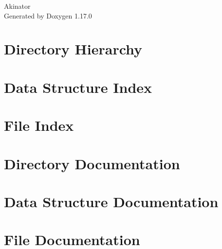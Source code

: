 \documentclass[twoside]{book}
\newcommand{\+}{\discretionary{\mbox{\scriptsize$\hookleftarrow$}}{}{}}
\newcommand{\clearemptydoublepage}{%
    \newpage{\pagestyle{empty}\cleardoublepage}%
  }
\begin{document}
  \raggedbottom
    \hypersetup{pageanchor=false,
                bookmarksnumbered=true,
                pdfencoding=unicode
               }
  \begin{titlepage}
  \vspace*{7cm}
  \begin{center}%
  {\Large Akinator}\\
  \vspace*{1cm}
  {\large Generated by Doxygen 1.17.0}\\
  \end{center}
  \end{titlepage}
  \clearemptydoublepage
  \tableofcontents
  \clearemptydoublepage
  \hypersetup{pageanchor=true}
\chapter{Directory Hierarchy}

\chapter{Data Structure Index}

\chapter{File Index}

\chapter{Directory Documentation}

\chapter{Data Structure Documentation}



\chapter{File Documentation}













  \backmatter
  \newpage
  \clearemptydoublepage
  \printindex
\end{document}
